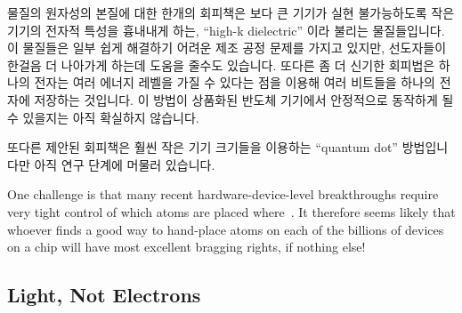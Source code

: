 \iffalse
Stephen Hawking is said to have claimed that semiconductor manufacturers
have but two fundamental problems: (1) the finite speed of light and
(2) the atomic nature of matter~\cite{BryanGardiner2007}.
It is possible that semiconductor manufacturers are approaching these
limits, but there are nevertheless a few avenues of research and
development focused on working around these fundamental limits.
\fi

물질의 원자성의 본질에 대한 한개의 회피책은 보다 큰 기기가 실현 불가능하도록
작은 기기의 전자적 특성을 흉내내게 하는, ``high-k dielectric'' 이라 불리는
물질들입니다.
이 물질들은 일부 쉽게 해결하기 어려운 제조 공정 문제를 가지고 있지만,
선도자들이 한걸음 더 나아가게 하는데 도움을 줄수도 있습니다.
또다른 좀 더 신기한 회피법은 하나의 전자는 여러 에너지 레벨을 가질 수 있다는
점을 이용해 여러 비트들을 하나의 전자에 저장하는 것입니다.
이 방법이 상품화된 반도체 기기에서 안정적으로 동작하게 될 수 있을지는 아직
확실하지 않습니다.

또다른 제안된 회피책은 훨씬 작은 기기 크기들을 이용하는 ``quantum dot''
방법입니다만 아직 연구 단계에 머물러 있습니다.

\iffalse
One workaround for the atomic nature of matter are so-called
``high-K dielectric'' materials, which allow larger devices to mimic the
electrical properties of infeasibly small devices.
These materials pose some severe fabrication challenges, but nevertheless
may help push the frontiers out a bit farther.
Another more-exotic workaround stores multiple bits in a single electron,
relying on the fact that a given electron can exist at a number of
energy levels.
It remains to be seen if this particular approach can be made to work
reliably in production semiconductor devices.

Another proposed workaround is the ``quantum dot'' approach that
allows much smaller device sizes, but which is still in the research
stage.
\fi

One challenge is that many recent hardware-device-level breakthroughs
require very tight control of which atoms are placed
where~\cite{MichaelJKelly2017DeviceLevel}.
It therefore seems likely that whoever finds a good way to hand-place
atoms on each of the billions of devices on a chip will have most
excellent bragging rights, if nothing else!

\subsection{Light, Not Electrons}
\label{sec:cpu:Light, Not Electrons}

